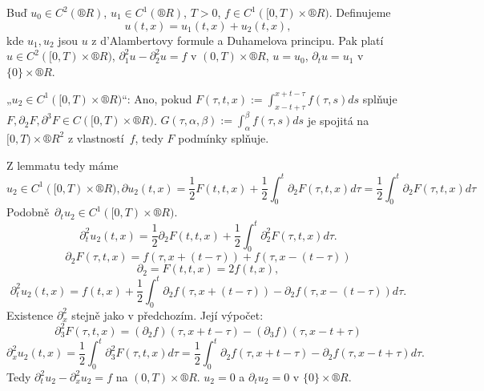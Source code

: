 \documentclass[12pt]{article}					%
\begin{document}
\begin{veta}
	Buď $u_0 \in C^2(®R)$, $u_1 \in C^1(®R)$, $T > 0$, $f \in C^1([0, T) \times ®R)$. Definujeme
	$$ u(t, x) = u_1(t, x) + u_2(t, x), $$
	kde $u_1, u_2$ jsou $u$ z d'Alambertovy formule a Duhamelova principu. Pak platí $u \in C^2([0, T) \times ®R)$, $\partial_1^2 u - \partial_2^2 u = f$ v $(0, T) \times ®R$, $u = u_0$, $\partial_t u = u_1$ v $\{0\} \times ®R$.

	\begin{dukazin}
		„$u_2 \in C^1([0, T) \times ®R)$“: Ano, pokud $F(\tau, t, x) := \int_{x - t + \tau}^{x + t - \tau} f(\tau, s) ds$ splňuje $F, \partial_2 F, \partial^3 F \in C([0, T) \times ®R)$. $G(\tau, \alpha, \beta) := \int_\alpha^\beta f(\tau, s) ds$ je spojitá na $[0, T) \times ®R^2$ z vlastností $f$, tedy $F$ podmínky splňuje.

		Z lemmatu tedy máme
		$$ u_2 \in C^1([0, T) \times ®R), \partial u_2(t, x) = \frac{1}{2} F(t, t, x) + \frac{1}{2} \int_0^t \partial_2 F(\tau, t, x) d\tau = \frac{1}{2} \int_0^t \partial_2 F(\tau, t, x) d\tau $$
		Podobně $\partial_t u_2 \in C^1([0, T) \times ®R)$.
		$$ \partial_t^2 u_2(t, x) = \frac{1}{2} \partial_2 F(t, t, x) + \frac{1}{2} \int_0^t \partial_2^2 F(\tau, t, x) d\tau. $$
		$$ \partial_2 F(\tau, t, x) = f(\tau, x+(t - \tau)) + f(\tau, x - (t - \tau)) $$
		$$ \partial_2 = F(t, t, x) = 2 f(t, x), $$
		$$ \partial_t^2 u_2(t, x) = f(t, x) + \frac{1}{2} \int_0^t \partial_2 f(\tau, x + (t - \tau)) - \partial_2 f(\tau, x - (t - \tau)) d\tau. $$
		Existence $\partial_x^2$ stejně jako v předchozím. Její výpočet:
		$$ \partial_3^2 F(\tau, t, x) = (\partial_2 f)(\tau, x + t - \tau) - (\partial_3 f)(\tau, x - t + \tau) $$
		$$ \partial_x^2 u_2(t, x) = \frac{1}{2} \int_0^t \partial_3^2 F(\tau, t, x) d\tau = \frac{1}{2} \int_0^t \partial_2 f(\tau, x + t - \tau) - \partial_2 f (\tau, x - t + \tau) d\tau. $$
		Tedy $\partial^2_t u_2 - \partial_x^2 u_2 = f$ na $(0, T) \times ®R$. $u_2=0$ a $\partial_t u_2 = 0$ v $\{0\} \times ®R$.
	\end{dukazin}
\end{veta}
\end{document}
